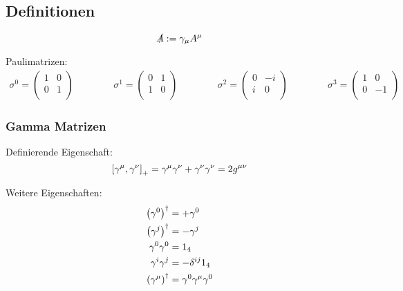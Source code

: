 \documentclass[11pt]{article}
\numberwithin{equation}{section}
\begin{document}
		\subsection{Definitionen}
			\begin{equation}
				\slashed{A} := \gamma_\mu A^\mu
			\end{equation}

			\noindent
			Paulimatrizen:
			\begin{equation}
				\begin{aligned}
					\sigma^0 = \left(\begin{matrix}
						1 & 0 \\
						0 & 1 \\
					\end{matrix}\right) &&\hspace{30pt}
					\sigma^1 = \left(\begin{matrix}
						0 & 1 \\
						1 & 0 \\
					\end{matrix}\right) &&\hspace{30pt}
					\sigma^2 = \left(\begin{matrix}
						0 & -i \\
							i & 0 \\
					\end{matrix}\right) &&\hspace{30pt}
					\sigma^3 = \left(\begin{matrix}
						1 & 0 \\
						0 & -1 \\
					\end{matrix}\right)
				\end{aligned}
			\end{equation}

			\subsubsection{Gamma Matrizen}
				\noindent
				Definierende Eigenschaft:
				\begin{equation}
					\left[\gamma^\mu,\gamma^\nu\right]_{+} = \gamma^\mu \gamma^\nu + \gamma^\nu \gamma^\nu = 2g^{\mu\nu}
				\end{equation}

				\noindent
				Weitere Eigenschaften:
				\begin{equation}
					\begin{aligned}
						\Br{\gamma^0}^\dagger &= +\gamma^0 \\
						\Br{\gamma^j}^\dagger &= -\gamma^j \\
						\gamma^0 \gamma^0 &= 1_4 \\ %
						\gamma^i \gamma^j &= - \delta^{ij} 1_4 \\
						\Br{\gamma^\mu}^\dagger &= \gamma^0 \gamma^\mu \gamma^0 \\
					\end{aligned}
				\end{equation}
\end{document}
